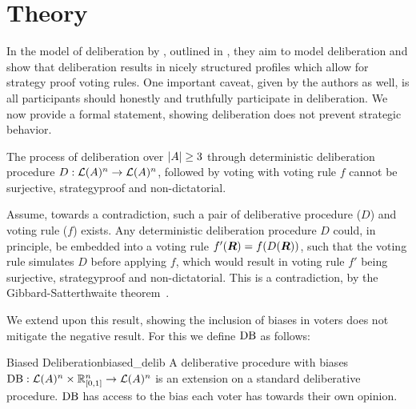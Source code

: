 \newpage \chapter{Theory} \label{theory}


In the model of deliberation by
\citet{radDeliberationSinglePeakednessCoherent2021}, outlined in
, they aim to model deliberation and show that
deliberation results in nicely structured profiles which allow for strategy
proof voting rules. One important caveat, given by the authors as well, is all
participants should honestly and truthfully participate in deliberation. We now
provide a formal statement, showing deliberation does not prevent strategic
behavior.

\begin{proposition} The process of deliberation over $|A| \geq 3$
	through deterministic deliberation procedure \({D}:
	\mathcal{L}(A)^n \to \mathcal{L}(A)^n\), followed by voting
	with voting rule $f$ cannot be surjective, strategyproof and
	non-dictatorial.

\label{proposition:deterministic-delib} \end{proposition}

\begin{proofc} Assume, towards a contradiction, such a pair of deliberative
procedure ($D$) and voting rule (\(f\)) exists. Any deterministic deliberation
procedure $D$ could, in principle, be embedded into a voting rule
$f'(\boldsymbol{R}) = f(D(\boldsymbol{R}))$, such that the voting rule
simulates $D$ before applying $f$, which would result in  voting rule $f'$
being surjective, strategyproof and non-dictatorial. This is a contradiction,
by the Gibbard-Satterthwaite
theorem~\citep{gibbardManipulationVotingSchemes1973,satterthwaiteStrategyproofnessArrowsConditions1975}.
\end{proofc}


We extend upon this result, showing the inclusion of biases in voters does not
mitigate the negative result. For this we define $\operatorname{DB}$ as
follows:

\begin{definition}{Biased Deliberation}{biased_delib} A deliberative procedure
	with biases $\operatorname{DB} : \mathcal{L}(A) ^ n \times
	\mathbb{R}_{[0,1]}^n \to \mathcal{L}(A)^n$ is an extension on a
	standard deliberative procedure. \(\operatorname{DB}\) has access to
	the bias each voter has towards their own opinion. \end{definition}

